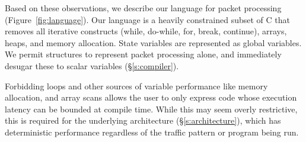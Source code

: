 Based on these observations, we describe our language for packet processing
(Figure~\ref{fig:language}). Our language is a heavily constrained subset of C
that removes all iterative constructs (while, do-while, for, break, continue),
arrays, heaps, and memory allocation. State variables are represented as global
variables. We permit structures to represent packet processing alone, and immediately
desugar these to scalar variables (\S\ref{s:compiler}).

Forbidding loops and other sources of variable performance like memory
allocation, and array scans allows the user to only express code whose
execution latency can be bounded at compile time.  While this may seem overly
restrictive, this is required for the underlying architecture
(\S\ref{s:architecture}), which has deterministic performance regardless of the
traffic pattern or program being run.

